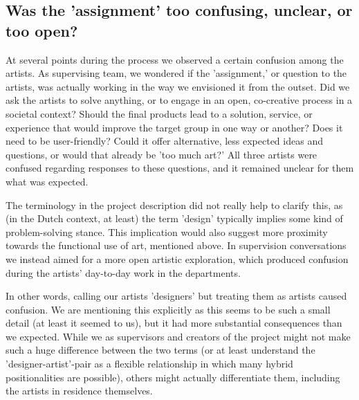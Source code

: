 \documentclass[authordate, empirical]{jote-new-article}
\begin{document}
	\subsection{Was the 'assignment' too confusing, unclear, or too open?}



	At several points during the process we observed a certain confusion among the artists. As supervising team, we wondered if the 'assignment,' or question to the artists, was actually working in the way we envisioned it from the outset. Did we ask the artists to solve anything, or to engage in an open, co-creative process in a societal context? Should the final products lead to a solution, service, or experience that would improve the target group in one way or another? Does it need to be user-friendly? Could it offer alternative, less expected ideas and questions, or would that already be 'too much art?' All three artists were confused regarding responses to these questions, and it remained unclear for them what was expected.







	The terminology in the project description did not really help to clarify this, as (in the Dutch context, at least) the term 'design' typically implies some kind of problem-solving stance. This implication would also suggest more proximity towards the functional use of art, mentioned above. In supervision conversations we instead aimed for a more open artistic exploration, which produced confusion during the artists' day-to-day work in the departments.







	In other words, calling our artists 'designers' but treating them as artists caused confusion. We are mentioning this explicitly as this seems to be such a small detail (at least it seemed to us), but it had more substantial consequences than we expected. While we as supervisors and creators of the project might not make such a huge difference between the two terms (or at least understand the 'designer-artist'-pair as a flexible relationship in which many hybrid positionalities are possible), others might actually differentiate them, including the artists in residence themselves.
\end{document}
